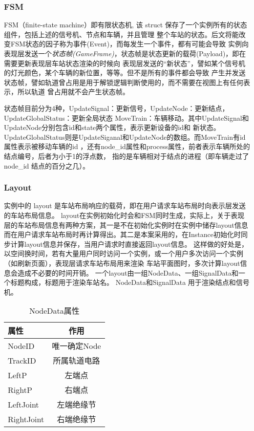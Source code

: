 \subsubsection{FSM}
FSM（finite-state machine）即有限状态机, 该 struct 保存了一个实例所有的状态组件，包括上述的信号机、节点和车辆，并且管理
整个车站的状态。后文将能改变FSM状态的因子称为事件(Event)，而每发生一个事件，都有可能会导致
实例向表现层发送一个\emph{状态帧(GameFrame)}，状态帧是状态更新的载荷(Payload)，即在需要更新表现层车站状态渲染的时候向
表现层发送的“新状态”，譬如某个信号机的灯光颜色，某个车辆的新位置，等等。但不是所有的事件都会导致
产生并发送状态帧，譬如轨道曾占用是用于解锁逻辑判断使用的，而不需要在视图上有任何表示，所以轨道
曾占用就不会产生状态帧。

状态帧目前分为4种，UpdateSignal：更新信号，UpdateNode：更新结点，UpdateGlobalStatus：更新全局状态
MoveTrain：车辆移动。其中UpdateSignal和UpdateNode分别包含id和state两个属性，表示更新设备的id和
新状态。UpdateGlobalStatus则是UpdateSiganal和UpdateNode的数组。而MoveTrain有id属性表示被移动车辆的id
，还有node\_id属性和process属性，前者表示车辆所处的结点编号，后者为小于1的浮点数，
指的是车辆相对于结点的进程（即车辆走过了node\_id 结点的百分之几）。

\subsubsection{Layout}
实例中的 layout 是车站布局响应的载荷，即在用户请求车站布局时向表示层发送的车站布局信息。
layout在实例初始化时会和FSM同时生成，实际上，关于表现层的车站布局信息有两种方案，其一是不在初始化实例时在实例中储存layout信息
而在用户请求车站布局时再计算得出。其二是本案采用的，在Instance初始化时同步计算layout信息并保存，当用户请求时直接返回layout信息。
这样做的好处是，以空间换时间，若有大量用户同时访问一个实例，或一个用户多次访问一个实例（如刷新页面），表现层请求车站布局用来渲染
车站平面图时，多次计算layout信息会造成不必要的时间开销。
一个layout由一组NodeData、一组SignalData和一个标题构成，标题用于渲染车站名。
NodeData和SignalData 用于渲染结点和信号机。

\begin{table}[htpb!]
    \centering
    \caption{\label{node_data}NodeData属性}
    \begin{threeparttable}
        \begin{tabular}{lc}
            \toprule
            属性       & 作用         \\
            \midrule
            NodeID     & 唯一确定Node \\
            TrackID    & 所属轨道电路 \\
            LeftP      & 左端点       \\
            RightP     & 右端点       \\
            LeftJoint  & 左端绝缘节   \\
            RightJoint & 右端绝缘节   \\
            \bottomrule
        \end{tabular}
    \end{threeparttable}
\end{table}

